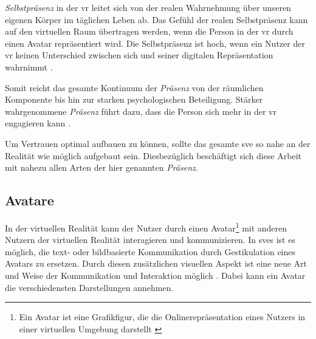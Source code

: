 \documentclass[a4paper,11pt]{article}%
\renewcommand{\\}{\vspace*{0.5\baselineskip} \newline}
\begin{document}
\textit{Selbstpräsenz} in der \ac{vr} leitet sich von der realen Wahrnehmung über unseren eigenen Körper im täglichen Leben ab. Das Gefühl der realen Selbstpräsenz kann auf den virtuellen Raum übertragen werden, wenn die Person in der \ac{vr} durch einen Avatar repräsentiert wird. Die Selbstpräsenz ist hoch, wenn ein Nutzer der \ac{vr} keinen Unterschied zwischen sich und seiner digitalen Repräsentation wahrnimmt \citep[S. 439]{schultze2010embodiment}.

Somit reicht das gesamte Kontinuum der \textit{Präsenz} von der räumlichen Komponente bis hin zur starken psychologischen Beteiligung. Stärker wahrgenommene \textit{Präsenz} führt dazu, dass die Person sich mehr in der \ac{vr} engagieren kann \citep{biocca2001criteria}.

Um Vertrauen optimal aufbauen zu können, sollte das gesamte \ac{sve} so nahe an der Realität wie möglich aufgebaut sein. Diesbezüglich beschäftigt sich diese Arbeit mit nahezu allen Arten der hier genannten \textit{Präsenz}.
\newpage

\subsection{Avatare}
\label{Avatare}
In der virtuellen Realität kann der Nutzer durch einen Avatar\footnote{Ein Avatar ist eine Grafikfigur, die die Onlinerepräsentation eines Nutzers in einer virtuellen Umgebung darstellt \citep[S. 196]{neitzel2010bin}} mit anderen Nutzern der virtuellen Realität interagieren und kommunizieren.
In \ac{sve}s ist es möglich, die text- oder bildbasierte Kommunikation durch Gestikulation eines Avatars zu ersetzen. Durch diesen zusätzlichen visuellen Aspekt ist eine neue Art und Weise der Kommunikation und Interaktion möglich \citep[S. 81]{haslam2003social}.
Dabei kann ein Avatar die verschiedensten Darstellungen annehmen.
\end{document}
